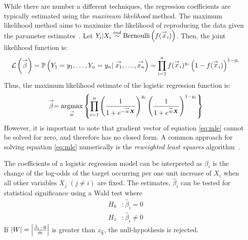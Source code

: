 While there are number a different techniques, the regression coefficients are typically estimated using the \emph{maximum likelihood} method. The maximum likelihood method aims to maximize the likelihood of reproducing the data given the parameter estimates~\citep{An-Introduction-to-Logistic-Regression-Analysis-and-Reporting}. Let $Y_i | X_i \stackrel{ind}{\sim} \mathrm{Bernoulli} \left( f(\stackrel{\rightarrow}{x}_i) \right)$. Then, the joint likelihood function is:
\begin{align*}
    \mathcal{L} \left( \stackrel{\rightarrow}{\beta} \right) =
    \mathbb{P} \left( Y_1 = y_1, \dots, Y_n = y_n | \stackrel{\rightarrow}{x_1}, \dots, \stackrel{\rightarrow}{x_n} \right)
    = \prod_{i=1}^n f(\stackrel{\rightarrow}{x}_i)^{y_i} \left( 1 - f(\stackrel{\rightarrow}{x}_i) \right)^{1-y_i}
\end{align*}
Thus, the maximum likelihood estimate of the logistic regression function is:
\begin{align}
    \vec{\beta} = \argmax{\vec{w}}{\prod_{i=1}^n \left( \frac{1}{1+e^{-\vec{w}\matrx{X}}} \right)^{y_i} \left( \frac{1}{1+e^{\vec{w}\matrx{X}}} \right)^{1-y_i} \label{eq:mle}}
\end{align}
However, it is important to note that gradient vector of equation \ref{eq:mle} cannot be solved for zero, and therefore has no closed form.
A common approach for solving equation \ref{eq:mle} numerically is the \emph{reweighted least squares} algorithm~\citep{Wasserman2004}.

The coefficients of a logistic regression model can be interpreted as $\beta_i$ is the change of the log-odds of the target occurring per one unit increase of $X_i$ when all other variables $X_j$ $(j \neq i)$ are fixed. 
The estimates, $\hat{\beta}_i$ can be tested for statistical significance using a Wald test where
\begin{align*}
    H_0&: \hat{\beta}_i = 0 \\
    H_1&: \hat{\beta}_i \neq 0
\end{align*}
If $\left| W \right| = \left| \frac{\hat{\beta}_i - 0}{\hat{\text{se}}} \right|$ is greater than $z_{\frac{\alpha}{2}}$, the null-hypothesis is rejected.